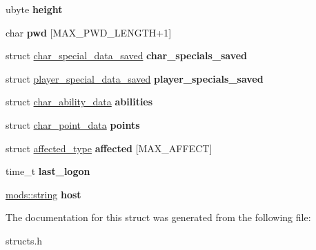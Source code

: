 \begin{DoxyCompactItemize}
ubyte {\bfseries height}
\item 
\mbox{\label{structchar__file__u_a723e4029d9dcdfdbe16511cf326945e6}} 
char {\bfseries pwd} \mbox{[}M\+A\+X\+\_\+\+P\+W\+D\+\_\+\+L\+E\+N\+G\+TH+1\mbox{]}
\item 
\mbox{\label{structchar__file__u_a38d976308fcf8c2aebc9d6ddd8d37e9b}} 
struct \hyperlink{structchar__special__data__saved}{char\+\_\+special\+\_\+data\+\_\+saved} {\bfseries char\+\_\+specials\+\_\+saved}
\item 
\mbox{\label{structchar__file__u_af0e5dec9fedd27e7a905a68e434c3fd8}} 
struct \hyperlink{structplayer__special__data__saved}{player\+\_\+special\+\_\+data\+\_\+saved} {\bfseries player\+\_\+specials\+\_\+saved}
\item 
\mbox{\label{structchar__file__u_a0d6db69e76c7d938129e996bc8109ba6}} 
struct \hyperlink{structchar__ability__data}{char\+\_\+ability\+\_\+data} {\bfseries abilities}
\item 
\mbox{\label{structchar__file__u_a5a993613db9ecffbbb51dbe0814dc4af}} 
struct \hyperlink{structchar__point__data}{char\+\_\+point\+\_\+data} {\bfseries points}
\item 
\mbox{\label{structchar__file__u_a259548f0b9e4a315497065c371938548}} 
struct \hyperlink{structaffected__type}{affected\+\_\+type} {\bfseries affected} \mbox{[}M\+A\+X\+\_\+\+A\+F\+F\+E\+CT\mbox{]}
\item 
\mbox{\label{structchar__file__u_a921da206c6edc4e5f54e8f37be8d97ef}} 
time\+\_\+t {\bfseries last\+\_\+logon}
\item 
\mbox{\label{structchar__file__u_ae09ca068269cefaa6fec586ae35819e7}} 
\hyperlink{structmods_1_1string}{mods\+::string} {\bfseries host}
\end{DoxyCompactItemize}


The documentation for this struct was generated from the following file\+:\begin{DoxyCompactItemize}
\item 
structs.\+h\end{DoxyCompactItemize}
